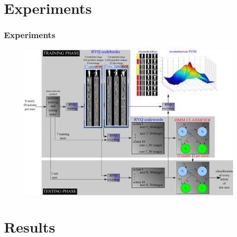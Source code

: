 \begin{frame}[plain]
\begin{columns}
\begin{column}{2.8in}
\begin{figure}
			\end{figure}
			\hspace{-0.2in}
	\end{column}
	\end{columns}
\end{frame}






\section{Experiments}
\begin{frame}[plain]
\frametitle{Experiments}
	\begin{changemargin}{-1.3in}{0in}
	\begin{figure}	
		\includegraphics[width=1.35\textwidth]{figs/RVQ_HMM_IPCV2010_blockDiagram.pdf}
	\end{figure}
	\end{changemargin}
\end{frame}








\section{Results}


